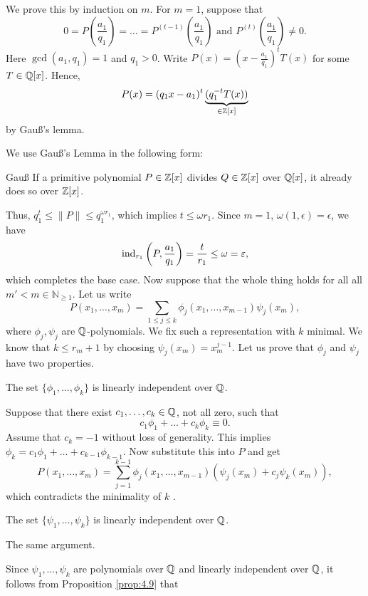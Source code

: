 \documentclass{Vorlesungstemplate_English} %
\renewcommand{\N}{\mathbb{N}_{\geq 1}}
\begin{document}
\begin{pf}
  We prove this by induction on $m$. For $m=1$, suppose that
  \[ 0 = P\left(\frac{a_1}{q_1}\right) = \dots = P^{(t-1)}\left(\frac{a_1}{q_1}\right) \text{ and } P^{(t)}\left(\frac{a_1}{q_1}\right) \neq 0.\]
  Here $\gcd(a_1,q_1) = 1$ and $q_1 > 0$. Write $P(x) = \left(x-\frac{a_1}{q_1}\right)^tT(x)$ for some $T \in \mathbb{Q}[x]$. Hence,
  \[ P(x) = (q_1x-a_1)^t\underbrace{(q_1^{-t}T(x))}_{\in \mathbb{Z}[x]}\]
  by Gauß's lemma. {\color{blue} We use Gauß's Lemma in the following form:
  \begin{lemma*}[coltitle=blue]{Gauß}
    \color{blue} If a primitive polynomial $P \in \mathbb{Z}[x]$ divides $Q \in \mathbb{Z}[x]$ over $\mathbb{Q}[x]$, it already does so over $\mathbb{Z}[x]$.
  \end{lemma*}} Thus, $q_1^t \leq \|P\| \leq q_1^{\omega r_1}$, which implies $t \leq \omega r_1$. Since $m=1$, $\omega(1,\epsilon) = \epsilon$, we have
  \[ \text{ind}_{r_1}\left(P, \frac{a_1}{q_1}\right) = \frac{t}{r_1} \leq \omega = \varepsilon,\]
  which completes the base case. Now suppose that the whole thing holds for all all $m' < m \in \N$. Let us write
  \[ P(x_1, \dots, x_m) = \sum_{1 \leq j \leq k}\phi_j(x_1, \dots, x_{m-1})\psi_j(x_m),\]
  where $\phi_j, \psi_j$ are $\mathbb{Q}$-polynomials. We fix such a representation with $k$ minimal. We know that $k \leq r_m+1$ by choosing $\psi_j(x_m) = x_m^{j-1}$. Let us prove that $\phi_j$ and $\psi_j$ have two properties.
  \begin{claim}{}{}
    The set $\{ \phi_1, \dots, \phi_k\}$ is linearly independent over $\mathbb{Q}$.
  \end{claim}
  \begin{pf}
    Suppose that there exist $c_1, \dots, c_k \in \mathbb{Q}$, not all zero, such that
    \[ c_1\phi_1 + \dots + c_k\phi_k \equiv 0.\]
    Assume that $c_k = -1$ without loss of generality. This implies $\phi_k = c_1\phi_1 + \dots + c_{k-1}\phi_{k-1}$. Now substitute this into $P$ and get
    \[ P(x_1, \dots, x_m) = \sum_{j=1}^{k-1}\phi_j(x_1, \dots, x_{m-1})(\psi_j(x_m)+c_j\psi_k(x_m)),\]
    which contradicts the minimality of $k$ \Lightning.
  \end{pf}
  \begin{claim}{}{}
    The set $\{ \psi_1, \dots, \psi_k\}$ is linearly independent over $\mathbb{Q}$.
  \end{claim}
  \begin{pf}
    The same argument.
  \end{pf}
  Since $\psi_1, \dots, \psi_k$ are polynomials over $\mathbb{Q}$ and linearly independent over $\mathbb{Q}$, it follows from Proposition \ref{prop:4.9} that

\end{pf}
\end{document}
